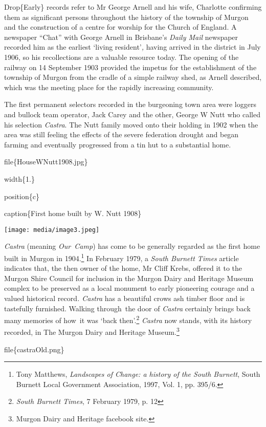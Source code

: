 Drop\{Early\} records refer to Mr George Arnell and his wife, Charlotte confirming them as significant persons throughout the history of the township of Murgon and the construction of a centre for worship for the Church of England. A newspaper ``Chat'' with George Arnell in Brisbane's \emph{Daily Mail} newspaper recorded him as the earliest `living resident'\emph{,} having arrived in the district in July 1906, so his recollections are a valuable resource today. The opening of the railway on 14 September 1903 provided the impetus for the establishment of the township of Murgon from the cradle of a simple railway shed, as Arnell described, which was the meeting place for the rapidly increasing community.

The first permanent selectors recorded in the burgeoning town area were loggers and bullock team operator, Jack Carey and the other, George W Nutt who called his selection \emph{Castra}. The Nutt family moved onto their holding in 1902 when the area was still feeling the effects of the severe federation drought and began farming and eventually progressed from a tin hut to a substantial home.

file\{HouseWNutt1908.jpg\}

width\{1.\}

position\{c\}

caption\{First home built by W. Nutt 1908\}

\texttt{[image: media/image3.jpeg]}

\emph{Castra} (meaning \emph{Our~Camp}) has come to be generally regarded as the first home built in Murgon in 1904.\footnote{Tony Matthews, \emph{Landscapes of Change: a history of the South Burnett}, South Burnett Local Government Association, 1997, Vol. 1, pp. 395/6.} In February 1979, a \emph{South Burnett Times} article indicates that, the then owner of the home, Mr Cliff Krebs, offered it to the Murgon Shire Council for inclusion in the Murgon Dairy and Heritage Museum complex to be preserved as a local monument to early pioneering courage and a valued historical record\emph{. Castra} has a beautiful crows ash timber floor and is tastefully furnished. Walking through~the door of \emph{Castra} certainly brings back many memories of how~it was `back then'.\footnote{\emph{South Burnett Times}, 7 February 1979, p. 12} \emph{Castra} now stands, with its history recorded, in The Murgon Dairy and Heritage Museum.\footnote{Murgon Dairy and Heritage facebook site.}

file\{castraOld.png\}

